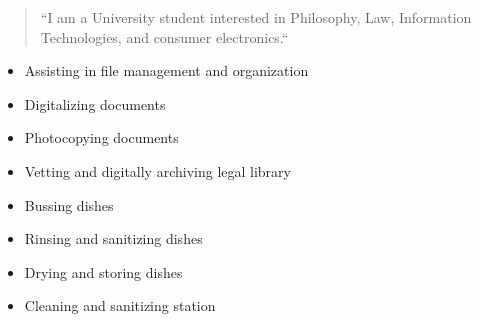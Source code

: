 \documentclass[10pt,letterpaper,ragged2e,withhyper]{altacv}
\author{Jordan Hogan-Sharpe}
\date{\today}
\title{}
\begin{document}


\makecvheader

\begin{paracol}{2}

\label{sec:org3fcaf91}
\begin{quote}
``I am a University student interested in Philosophy, Law, Information Technologies, and consumer electronics.``
\end{quote}

\label{sec:orgca3bafe}

\begin{itemize}
\item Assisting in file management and organization
\item Digitalizing documents
\item Photocopying documents
\item Vetting and digitally archiving legal library
\end{itemize}

\label{sec:orgc8faffa}

\begin{itemize}
\item Bussing dishes
\item Rinsing and sanitizing dishes
\item Drying and storing dishes
\item Cleaning and sanitizing station
\end{itemize}

\switchcolumn

\label{sec:orgb3710b2}

\divider


\divider


\divider


\end{paracol}
\end{document}
